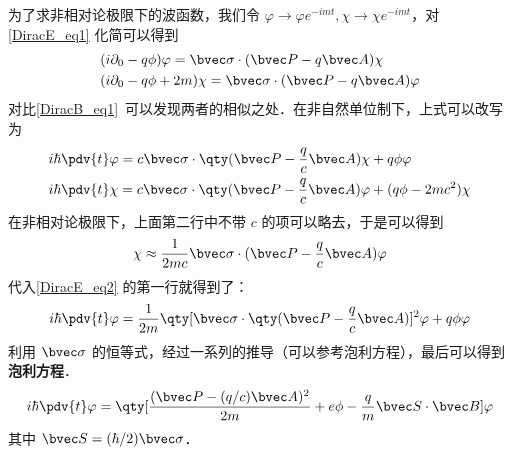 为了求非相对论极限下的波函数，我们令 $\varphi\rightarrow \varphi e^{-imt},\chi\rightarrow \chi e^{-imt}$，对 \autoref{DiracE_eq1} 化简可以得到
\begin{equation}
\begin{aligned}
&(i\partial_0 - q \phi)\varphi = \bvec \sigma\cdot (\bvec P-q\bvec A) \chi\\
&(i\partial_0 - q \phi + 2m) \chi = \bvec \sigma\cdot (\bvec P-q\bvec A)  \varphi
\end{aligned}
\end{equation}
对比\autoref{DiracB_eq1}~可以发现两者的相似之处．在非自然单位制下，上式可以改写为
\begin{equation}\label{DiracE_eq2}
\begin{aligned}
&i\hbar \pdv{t} \varphi = c\bvec \sigma\cdot \qty(\bvec P-\frac{q}{c}\bvec A)\chi + q \phi \varphi\\
&i\hbar\pdv{t} \chi = c \bvec \sigma\cdot \qty(\bvec P-\frac{q}{c}\bvec A) \varphi + (q \phi-2mc^2) \chi
\end{aligned}
\end{equation}
在非相对论极限下，上面第二行中不带 $c$ 的项可以略去，于是可以得到
\begin{equation}
\chi\approx \frac{1}{2mc} \bvec \sigma \cdot(\bvec P-\frac{q}{c}\bvec A)\varphi
\end{equation}
代入\autoref{DiracE_eq2} 的第一行就得到了：
\begin{equation}
i\hbar\pdv{t} \varphi = \frac{1}{2m}\qty[\bvec \sigma \cdot\qty(\bvec P - \frac{q}{c}\bvec A)]^2 \varphi + q\phi  \varphi
\end{equation}
利用 $\bvec \sigma$ 的恒等式，经过一系列的推导（可以参考泡利方程），最后可以得到\textbf{泡利方程}．
\begin{equation}
i\hbar\pdv{t} \varphi = \qty[\frac{(\bvec P - (q/c)\bvec A)^2}{2m}+e\phi-\frac{q}{m}\bvec S\cdot \bvec B]\varphi
\end{equation}
其中 $\bvec S=(\hbar/2)\bvec \sigma$．